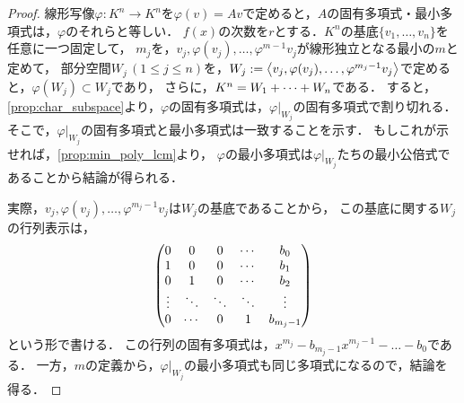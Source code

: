 \begin{proof}
線形写像$\varphi\colon K^n \to K^n$を$\varphi(v)=Av$で定めると，$A$の固有多項式・最小多項式は，$\varphi$のそれらと等しい．
$f(x)$の次数を$r$とする．$K^n$の基底$\{v_1,\dots,v_n\}$を任意に一つ固定して，
$m_j$を，$v_j,\varphi(v_j),\dots,\varphi^{m-1}v_j$が線形独立となる最小の$m$と定めて，
部分空間$W_j\,(1 \le j \le n)$を，$W_j := \gen{v_j,\varphi(v_j),\dots,\varphi^{m_j-1}v_j }$で定めると，$\varphi(W_j) \subset W_j$であり，
さらに，$K^n = \idxsum{W}{1}{n}{+}$である．
すると，\cref{prop:char_subspace}より，$\varphi$の固有多項式は，$\varphi|_{W_j}$の固有多項式で割り切れる．
そこで，$\varphi|_{W_j}$の固有多項式と最小多項式は一致することを示す．
もしこれが示せれば，\cref{prop:min_poly_lcm}より，
$\varphi$の最小多項式は$\varphi|_{W_j}$たちの最小公倍式であることから結論が得られる．

実際，$v_j,\varphi(v_j),\dots,\varphi^{m_j-1}v_j$は$W_j$の基底であることから，
この基底に関する$W_j$の行列表示は，
\[
    \pmt{
        0 & 0 & 0 & \cdots & b_0 \\
        1 & 0 & 0 & \cdots & b_1 \\
        0 & 1 & 0 & \cdots & b_2 \\
        \vdots & \ddots & \ddots & \ddots & \vdots \\
        0 & \cdots & 0 & 1 & b_{m_j-1}
    }    
\]
という形で書ける．
この行列の固有多項式は，$x^{m_j} - b_{m_j-1}x^{m_j-1} - \dots - b_0$である．
一方，$m$の定義から，$\varphi|_{W_j}$の最小多項式も同じ多項式になるので，結論を得る．
\end{proof}